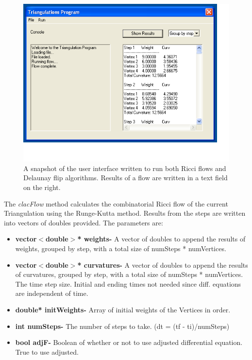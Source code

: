 \documentclass[12pt]{article}
\begin{document}
\begin{figure}
\begin{center}
\includegraphics[scale = 0.65]{Pictures/GUIpic.png}
\caption{A snapshot of the user interface written to run both Ricci flows and Delaunay flip algorithms. Results of a flow are written in a text field on the right.}
\end{center}
\end{figure}

\noindent The \textit{clacFlow} method calculates the combinatorial Ricci flow of the current Triangulation using the Runge-Kutta method. Results from the steps are written into vectors of doubles provided. The parameters are:\newline

\begin{itemize}
\item\textbf{vector$<$double$>$* weights-} A vector of doubles to append the results of weights, grouped by step, with a total size of numSteps * numVertices.
\item\textbf{vector$<$double$>$* curvatures-} A vector of doubles to append the results of curvatures, grouped by step, with a total size of numSteps * numVertices. The time step size. Initial and ending times not needed since diff. equations are independent of time.
\item\textbf{double* initWeights-} Array of initial weights of the Vertices in order.
\item\textbf{int numSteps-} The number of steps to take. (dt = (tf - ti)/numSteps)
\item\textbf{bool adjF-} Boolean of whether or not to use adjusted differential equation. True to use adjusted.
\end{itemize}
\end{document}
